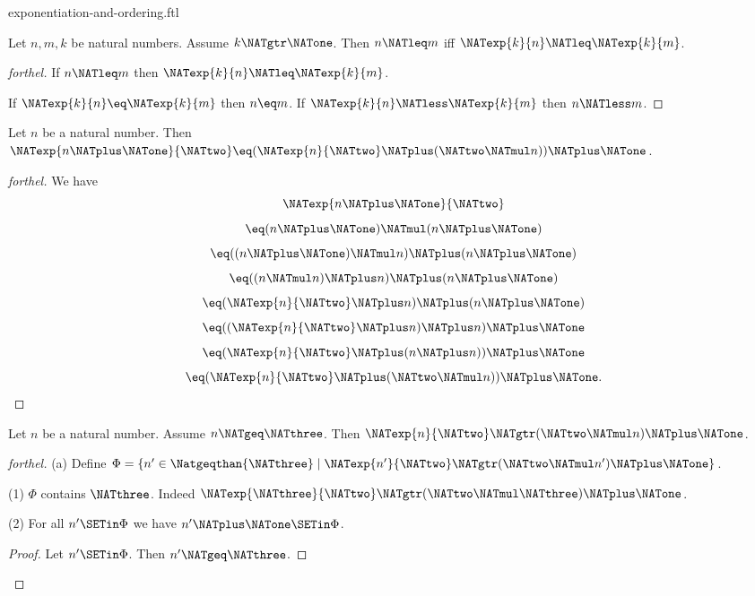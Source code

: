 \documentclass{stex}
\begin{document}
\begin{smodule}{exponentiation-and-ordering.ftl}
\begin{corollary}[forthel,id=ARITHMETIC_09_2876620253691904]
  Let $n, m, k$ be natural numbers.
  Assume $k \NATgtr \NATone$.
  Then $n \NATleq m$ iff $\NATexp{k}{n} \NATleq \NATexp{k}{m}$.
\end{corollary}
\begin{proof}[forthel]
  If $n \NATleq m$ then $\NATexp{k}{n} \NATleq \NATexp{k}{m}$.

  If $\NATexp{k}{n} \eq \NATexp{k}{m}$ then $n \eq m$.
  If $\NATexp{k}{n} \NATless \NATexp{k}{m}$ then $n \NATless m$.
\end{proof}

\begin{proposition}[forthel,id=ARITHMETIC_09_6984104377581568]
  Let $n$ be a natural number.
  Then $\NATexp{n \NATplus \NATone}{\NATtwo} \eq (\NATexp{n}{\NATtwo} \NATplus (\NATtwo \NATmul n)) \NATplus \NATone$.
\end{proposition}
\begin{proof}[forthel]
  We have
  \[  \NATexp{n \NATplus \NATone}{\NATtwo}                       \]
  \[    \eq (n \NATplus \NATone) \NATmul (n \NATplus \NATone)         \]
  \[    \eq ((n \NATplus \NATone) \NATmul n) \NATplus (n \NATplus \NATone)   \]
  \[    \eq ((n \NATmul n) \NATplus n) \NATplus (n \NATplus \NATone)   \]
  \[    \eq (\NATexp{n}{\NATtwo} \NATplus n) \NATplus (n \NATplus \NATone)         \]
  \[    \eq ((\NATexp{n}{\NATtwo} \NATplus n) \NATplus n) \NATplus \NATone         \]
  \[    \eq (\NATexp{n}{\NATtwo} \NATplus (n \NATplus n)) \NATplus \NATone         \]
  \[    \eq (\NATexp{n}{\NATtwo} \NATplus (\NATtwo \NATmul n)) \NATplus \NATone.    \]
\end{proof}

\begin{proposition}[forthel,id=ARITHMETIC_09_134060414337024]
  Let $n$ be a natural number.
  Assume $n \NATgeq \NATthree$.
  Then $\NATexp{n}{\NATtwo} \NATgtr (\NATtwo \NATmul n) \NATplus \NATone$.
\end{proposition}
\begin{proof}[forthel]
  (a) Define $\Phi = \{ n' \in \Natgeqthan{\NATthree} \mid \NATexp{n'}{\NATtwo} \NATgtr (\NATtwo \NATmul n') \NATplus \NATone \}$.

  (1) $\Phi$ contains $\NATthree$.
  Indeed $\NATexp{\NATthree}{\NATtwo} \NATgtr (\NATtwo \NATmul \NATthree) \NATplus \NATone$.

  (2) For all $n' \SETin \Phi$ we have $n' \NATplus \NATone \SETin \Phi$.
  \begin{proof}
    Let $n' \SETin \Phi$.
    Then $n' \NATgeq \NATthree$.


\end{proof}
\end{proof}
\end{smodule}
\end{document}
